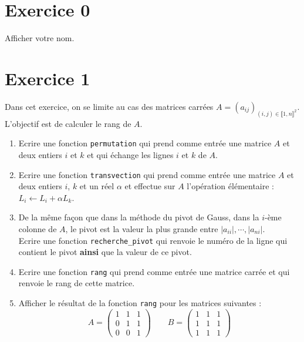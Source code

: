 





\begin{center}
{\Large\bf {\nom} \no {\num}}
\end{center}





\section*{Exercice 0}
Afficher votre nom.

\section*{Exercice 1}
Dans cet exercice, on se limite au cas des matrices carrées $A=(a_{ij})_{(i,j)\in\llbracket 1,n\rrbracket^2}$. L'objectif est de calculer le rang de $A$.
\begin{enumerate}
\item Ecrire une fonction \verb?permutation? qui prend comme entrée une matrice $A$ et deux entiers $i$ et $k$ et qui échange les lignes $i$ et $k$ de $A$.
\item Ecrire une fonction \verb?transvection? qui prend comme entrée une matrice $A$ et deux entiers $i$, $k$ et un réel $\alpha$ et effectue sur $A$ l'opération élémentaire : $L_i \longleftarrow L_i+\alpha L_k$.
\item De la même fa\c con que dans la méthode du pivot de Gauss, dans la $i$-ème colonne de $A$, le pivot est la valeur la plus grande entre $|a_{ii}|,\cdots,|a_{ni}|$.\\
Ecrire une fonction \verb?recherche_pivot? qui renvoie le numéro de la ligne qui contient le pivot \textbf{ainsi} que la valeur de ce pivot.
\item Ecrire une fonction \verb?rang? qui prend comme entrée une matrice carrée et qui renvoie le rang de cette matrice. 
\item Afficher le résultat de la fonction \verb?rang? pour les matrices suivantes :
\[A=\begin{pmatrix}
1&1&1\\0&1&1\\0&0&1
\end{pmatrix}  \qquad B=\begin{pmatrix}
1&1&1\\1&1&1\\1&1&1
\end{pmatrix}\]
\end{enumerate}

